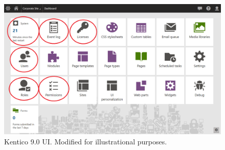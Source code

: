 \begin{figure}[ht!]
  \centering
  \includegraphics[width=\textwidth]{Images/Kentico9.png}
  \caption{Kentico 9.0 UI. Modified for illustrational purposes.}
  \label{kentico9UI}
\end{figure} 


